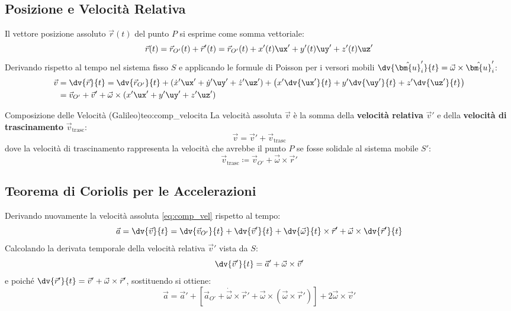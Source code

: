 \subsection{Posizione e Velocità Relativa}
Il vettore posizione assoluto $\vec{r}(t)$ del punto $P$ si esprime come somma vettoriale:
\begin{equation}
    \vec{r}(t) = \vec{r}_{O'}(t) + \vec{r}'(t) = \vec{r}_{O'}(t) + x'(t)\ux' + y'(t)\uy' + z'(t)\uz'
    \label{eq:pos_rel}
\end{equation}
Derivando rispetto al tempo nel sistema fisso $S$ e applicando le formule di Poisson per i versori mobili $\dv{\hat{\bm{u}}'_i}{t} = \vec{\omega} \times \hat{\bm{u}}'_i$:
\begin{align}
    \vec{v} &= \dv{\vec{r}}{t} = \dv{\vec{r}_{O'}}{t} + (\dot{x}'\ux' + \dot{y}'\uy' + \dot{z}'\uz') + \left(x'\dv{\ux'}{t} + y'\dv{\uy'}{t} + z'\dv{\uz'}{t}\right) \nonumber \\
    &= \vec{v}_{O'} + \vec{v}' + \vec{\omega}\times(x'\ux' + y'\uy' + z'\uz')
\end{align}

\begin{teorema}{Composizione delle Velocità (Galileo)}{teo:comp_velocita}
La velocità assoluta $\vec{v}$ è la somma della \textbf{velocità relativa} $\vec{v}'$ e della \textbf{velocità di trascinamento} $\vec{v}_{\text{trasc}}$:
\begin{equation}
    \vec{v} = \vec{v}' + \vec{v}_{\text{trasc}}
    \label{eq:comp_vel}
\end{equation}
dove la velocità di trascinamento rappresenta la velocità che avrebbe il punto $P$ se fosse solidale al sistema mobile $S'$:
\begin{equation}
    \vec{v}_{\text{trasc}} \coloneqq \vec{v}_{O'} + \vec{\omega}\times\vec{r}'
\end{equation}
\end{teorema}

\subsection{Teorema di Coriolis per le Accelerazioni}

Derivando nuovamente la velocità assoluta \eqref{eq:comp_vel} rispetto al tempo:
\begin{equation}
    \vec{a} = \dv{\vec{v}}{t} = \dv{\vec{v}_{O'}}{t} + \dv{\vec{v}'}{t} + \dv{\vec{\omega}}{t}\times\vec{r}' + \vec{\omega}\times\dv{\vec{r}'}{t}
\end{equation}
Calcolando la derivata temporale della velocità relativa $\vec{v}'$ vista da $S$:
\begin{equation}
    \dv{\vec{v}'}{t} = \vec{a}' + \vec{\omega}\times\vec{v}'
\end{equation}
e poiché $\dv{\vec{r}'}{t} = \vec{v}' + \vec{\omega}\times\vec{r}'$, sostituendo si ottiene:
\begin{equation}
    \vec{a} = \vec{a}' + \left[\vec{a}_{O'} + \dot{\vec{\omega}}\times\vec{r}' + \vec{\omega}\times(\vec{\omega}\times\vec{r}')\right] + 2\vec{\omega}\times\vec{v}'
\end{equation}

